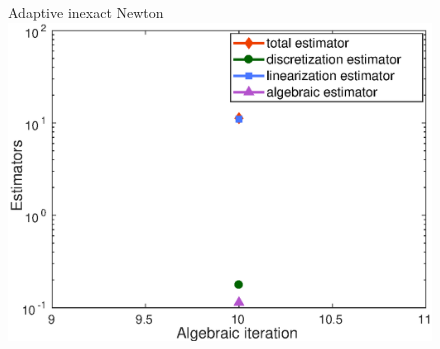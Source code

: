 \documentclass{beamer}
\begin{document}
\begin{frame}
\begin{figure}
\begin{minipage}[c]{.33\linewidth}
   \centering
   Adaptive inexact Newton
\includegraphics[width=\textwidth]{fig_article/adapt_inexact_resolution_estimators_gmres_iter_inside_first_newton_iter_Hmax_015.eps}     
\end{minipage}
\end{figure}


\end{frame}
\end{document}
